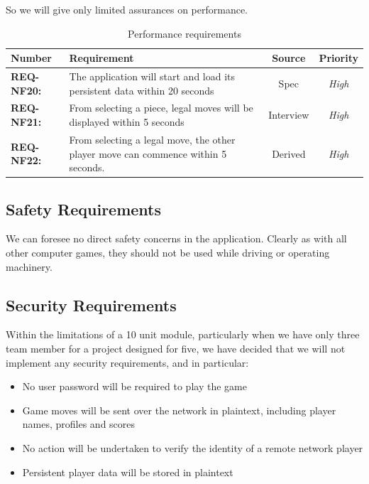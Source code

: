 \documentclass[a4paper,10pt]{article}
\begin{document}
So we will give only limited assurances on performance. 

\begin{table}[H]
\caption{Performance  requirements}
\label{table:PerfReqs}
\begin{tabular}{|| l | p{10.5cm}  |  c  | c ||} \hline  

\textbf{Number} & \textbf{Requirement} & \textbf{Source} & \textbf{Priority}\\ \hline

\textbf{REQ-NF20:}  & 
The application will start and load its persistent data within 20 seconds
& Spec & \textit{ High} \\

\textbf{REQ-NF21:} 
&  From selecting a piece, legal moves will be displayed within 5 seconds
& Interview  &  \textit{High}\\

\textbf{REQ-NF22:} 
&  From selecting a legal move, the other player move can commence within 5 seconds.
& Derived  &  \textit{High}\\

\hline
\end{tabular}
\end{table}


\subsection{Safety Requirements}

We can foresee no direct safety concerns in the application. Clearly as with all other computer games, they should not be used while driving or operating machinery. 

\subsection{Security Requirements}

Within the limitations of a 10 unit module, particularly when we have only three team member for a project designed for five, we have decided that we will not implement any security requirements, and in particular:

\begin{itemize}
\item No user password will be required to play the game
\item Game moves will be sent over the network in plaintext, including player names, profiles and scores
\item No action will be undertaken to verify the identity of a remote network player
\item Persistent player data will be stored in plaintext
\end{itemize}
\end{document}
